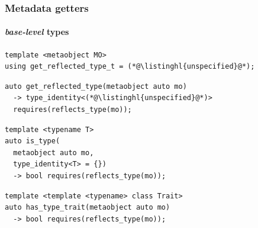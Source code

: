 \documentclass[compress,table,xcolor=table]{beamer}
\begin{document}
\begin{frame}[fragile]
  \frametitle{Metadata getters}
  \framesubtitle{{\em base-level} types}
 \begin{lstlisting}[language=c++2x,basicstyle=\small\ttfamily]
template <metaobject MO>
using get_reflected_type_t = (*@\listinghl{unspecified}@*);
  \end{lstlisting}
  \vfill
  \begin{lstlisting}[language=c++2x,basicstyle=\small\ttfamily]
auto get_reflected_type(metaobject auto mo)
  -> type_identity<(*@\listinghl{unspecified}@*)>
  requires(reflects_type(mo));
  \end{lstlisting}
  \vfill
  \begin{lstlisting}[language=c++2x,basicstyle=\small\ttfamily]
template <typename T>
auto is_type(
  metaobject auto mo,
  type_identity<T> = {})
  -> bool requires(reflects_type(mo));
  \end{lstlisting}
  \vfill
  \begin{lstlisting}[language=c++2x,basicstyle=\small\ttfamily]
template <template <typename> class Trait>
auto has_type_trait(metaobject auto mo)
  -> bool requires(reflects_type(mo));
  \end{lstlisting}
\end{frame}
\end{document}
